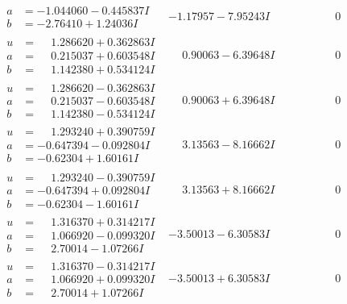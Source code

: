 \documentclass[1p]{elsarticle_modified}
\theoremstyle{definition}
\begin{document}
$$\begin{array}{c|c|c}
\begin{aligned}
a &= -1.044060 - 0.445837 I \\
b &= -2.76410 + 1.24036 I\end{aligned}
 & -1.17957 - 7.95243 I & \phantom{-0.000000 } 0 \\ \hline\begin{aligned}
u &= \phantom{-}1.286620 + 0.362863 I \\
a &= \phantom{-}0.215037 + 0.603548 I \\
b &= \phantom{-}1.142380 + 0.534124 I\end{aligned}
 & \phantom{-}0.90063 - 6.39648 I & \phantom{-0.000000 } 0 \\ \hline\begin{aligned}
u &= \phantom{-}1.286620 - 0.362863 I \\
a &= \phantom{-}0.215037 - 0.603548 I \\
b &= \phantom{-}1.142380 - 0.534124 I\end{aligned}
 & \phantom{-}0.90063 + 6.39648 I & \phantom{-0.000000 } 0 \\ \hline\begin{aligned}
u &= \phantom{-}1.293240 + 0.390759 I \\
a &= -0.647394 - 0.092804 I \\
b &= -0.62304 + 1.60161 I\end{aligned}
 & \phantom{-}3.13563 - 8.16662 I & \phantom{-0.000000 } 0 \\ \hline\begin{aligned}
u &= \phantom{-}1.293240 - 0.390759 I \\
a &= -0.647394 + 0.092804 I \\
b &= -0.62304 - 1.60161 I\end{aligned}
 & \phantom{-}3.13563 + 8.16662 I & \phantom{-0.000000 } 0 \\ \hline\begin{aligned}
u &= \phantom{-}1.316370 + 0.314217 I \\
a &= \phantom{-}1.066920 - 0.099320 I \\
b &= \phantom{-}2.70014 - 1.07266 I\end{aligned}
 & -3.50013 - 6.30583 I & \phantom{-0.000000 } 0 \\ \hline\begin{aligned}
u &= \phantom{-}1.316370 - 0.314217 I \\
a &= \phantom{-}1.066920 + 0.099320 I \\
b &= \phantom{-}2.70014 + 1.07266 I\end{aligned}
 & -3.50013 + 6.30583 I & \phantom{-0.000000 } 0 \\ \hline\begin{aligned}

\end{aligned}
\end{array}$$
\end{document}
